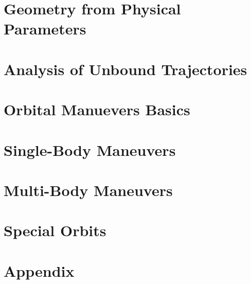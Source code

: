 \documentclass{article}
\begin{document}
\pagebreak
\section{Geometry from Physical Parameters}\label{sec:Geometry from Physical Parameters}


\pagebreak
\section{Analysis of Unbound Trajectories}\label{sec:Special Trajectories}


\pagebreak
\section{Orbital Manuevers Basics}\label{sec:Manuevers Basics}


\pagebreak
\section{Single-Body Maneuvers}\label{sec:Manuevers}


\pagebreak
\section{Multi-Body Maneuvers}\label{sec:Advanced Manuevers}


\pagebreak
\section{Special Orbits}\label{sec:Special Orbits}


\pagebreak
\section{Appendix}\label{sec:Appendix}


\end{document}
